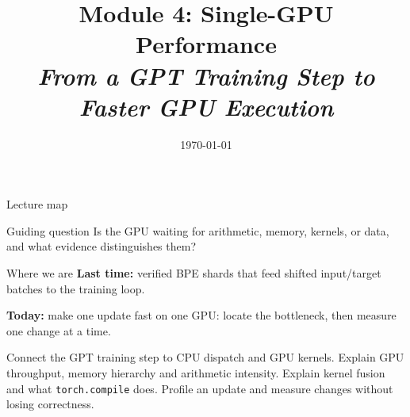 \documentclass[handout]{beamer}
\title[TASLLM -- Module 4]{Module 4: Single-GPU Performance\\[4pt]
\normalsize\itshape From a GPT Training Step to Faster GPU Execution}
\date{\today}
\begin{document}
\makelecturetitle

\begin{frame}{Lecture map}
  \tableofcontents
  \vfill
  \begin{block}{Guiding question}
    Is the GPU waiting for arithmetic, memory, kernels, or data, and what evidence distinguishes them?
  \end{block}
\end{frame}

\begin{frame}{Where we are}
  \vspace{10pt}
  \textbf{\textcolor{accentdark}{Last time:}} verified BPE shards that feed shifted input/target batches to the training loop.\par
  \vspace{10pt}
  \textbf{\textcolor{signaldark}{Today:}} make one update fast on one GPU: locate the bottleneck, then measure one change at a time.
\end{frame}

\learninggoals
{Connect the GPT training step to CPU dispatch and GPU kernels.}
{Explain GPU throughput, memory hierarchy and arithmetic intensity.}
{Explain kernel fusion and what \texttt{torch.compile} does.}
{Profile an update and measure changes without losing correctness.}
\end{document}
